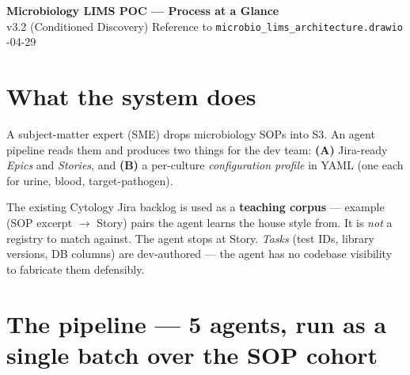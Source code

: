 \documentclass[10.5pt,letterpaper]{article}
\begin{document}
\begin{center}
{\Large\bfseries Microbiology LIMS POC --- Process at a Glance}\\[2pt]
{\small v3.2 (Conditioned Discovery) \quad\textbar\quad Reference to \texttt{microbio\_lims\_architecture.drawio} \quad\textbar{}-04-29}
\end{center}

\section{What the system does}

A subject-matter expert (SME) drops microbiology SOPs into S3. An agent pipeline reads them and produces two things for the dev team: \textbf{(A)} Jira-ready \emph{Epics} and \emph{Stories}, and \textbf{(B)} a per-culture \emph{configuration profile} in YAML (one each for urine, blood, target-pathogen).

The existing Cytology Jira backlog is used as a \textbf{teaching corpus} --- example (SOP excerpt $\rightarrow$ Story) pairs the agent learns the house style from. It is \emph{not} a registry to match against. The agent stops at Story. \emph{Tasks} (test IDs, library versions, DB columns) are dev-authored --- the agent has no codebase visibility to fabricate them defensibly.

\section{The pipeline --- 5 agents, run as a single batch over the SOP cohort}
\end{document}
